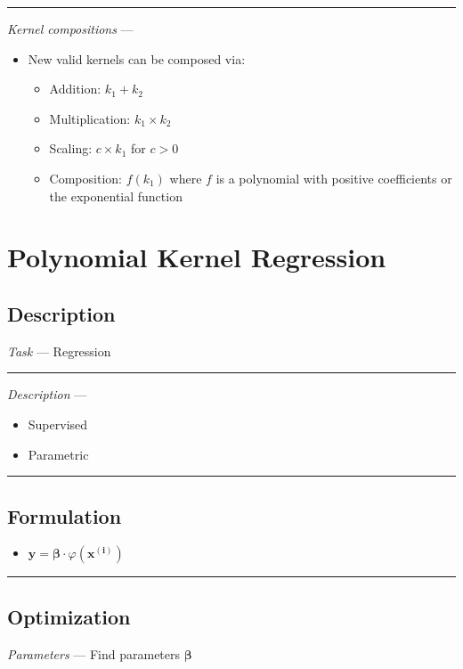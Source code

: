 {\color{lightgray}\hrule height 0.001mm}

\emph{Kernel compositions} ---
\begin{itemize}
    \item New valid kernels can be composed via:
    \begin{itemize}
        \item Addition: $k_1 + k_2$
        \item Multiplication: $k_1 \times k_2$
        \item Scaling: $c \times k_1$ for $c > 0$
        \item Composition: $f(k_1)$ where $f$ is a polynomial with positive coefficients or the exponential function
    \end{itemize}
\end{itemize}

\section{Polynomial Kernel Regression}
\subsection*{Description}
\emph{Task} --- Regression

{\color{lightgray}\hrule height 0.001mm}

\emph{Description} --- 
\begin{itemize}
    \item Supervised
    \item Parametric
\end{itemize}

{\color{black}\hrule height 0.001mm}

\subsection*{Formulation}

\begin{itemize}
    \item $\boldsymbol{y} = \boldsymbol{\beta} \cdot \varphi(\boldsymbol{x^{(i)}})$
\end{itemize}

{\color{black}\hrule height 0.001mm}

\subsection*{Optimization}
\emph{Parameters} --- Find parameters $\boldsymbol{\beta}$

